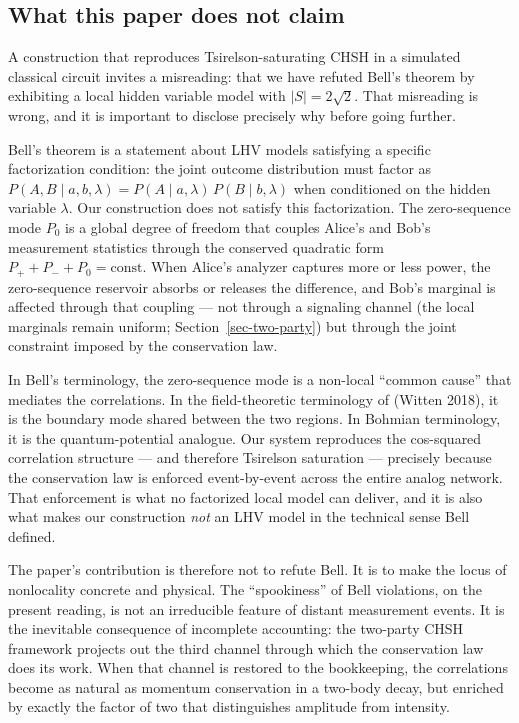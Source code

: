 \documentclass[
  11pt]{article}
\begin{document}
\subsection{What this paper does not
claim}\label{what-this-paper-does-not-claim}

A construction that reproduces Tsirelson-saturating CHSH in a simulated
classical circuit invites a misreading: that we have refuted Bell's
theorem by exhibiting a local hidden variable model with
\(|S| = 2\sqrt{2}\). That misreading is wrong, and it is important to
disclose precisely why before going further.

Bell's theorem is a statement about LHV models satisfying a specific
factorization condition: the joint outcome distribution must factor as
\(P(A,B \mid a, b, \lambda) = P(A \mid a, \lambda)\, P(B \mid b, \lambda)\)
when conditioned on the hidden variable \(\lambda\). Our construction
does not satisfy this factorization. The zero-sequence mode \(P_0\) is a
global degree of freedom that couples Alice's and Bob's measurement
statistics through the conserved quadratic form
\(P_+ + P_- + P_0 = \mathrm{const}\). When Alice's analyzer captures
more or less power, the zero-sequence reservoir absorbs or releases the
difference, and Bob's marginal is affected through that coupling --- not
through a signaling channel (the local marginals remain uniform;
Section~\ref{sec-two-party}) but through the joint constraint imposed by
the conservation law.

In Bell's terminology, the zero-sequence mode is a non-local ``common
cause'' that mediates the correlations. In the field-theoretic
terminology of (Witten 2018), it is the boundary mode shared between the
two regions. In Bohmian terminology, it is the quantum-potential
analogue. Our system reproduces the cos-squared correlation structure
--- and therefore Tsirelson saturation --- precisely because the
conservation law is enforced event-by-event across the entire analog
network. That enforcement is what no factorized local model can deliver,
and it is also what makes our construction \emph{not} an LHV model in
the technical sense Bell defined.

The paper's contribution is therefore not to refute Bell. It is to make
the locus of nonlocality concrete and physical. The ``spookiness'' of
Bell violations, on the present reading, is not an irreducible feature
of distant measurement events. It is the inevitable consequence of
incomplete accounting: the two-party CHSH framework projects out the
third channel through which the conservation law does its work. When
that channel is restored to the bookkeeping, the correlations become as
natural as momentum conservation in a two-body decay, but enriched by
exactly the factor of two that distinguishes amplitude from intensity.
\end{document}
